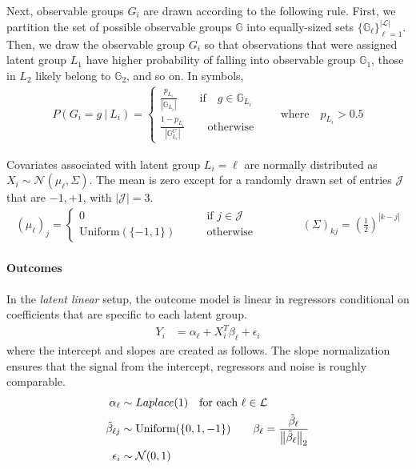 \documentclass{article}
\theoremstyle{plain}
\theoremstyle{definition}
\theoremstyle{remark}
\begin{document}
\noindent Next, observable groups $G_{i}$ are drawn according to the following rule. First, we partition the set of possible observable groups $\mathbb{G}$ into equally-sized sets $\{\mathbb{G}_{\ell}\}_{\ell=1}^{|\mathcal{L}|}$. Then, we draw the observable group $G_{i}$ so that observations that were assigned latent group $L_{1}$ have higher probability of falling into observable group $\mathbb{G}_{1}$, those in $L_{2}$ likely belong to $\mathbb{G}_{2}$, and so on. In symbols,
\begin{align}
    P(G_{i} = g \ | \ L_{i}) =
        \begin{cases}
            \frac{p_{L_{i}}}{|\mathbb{G}_{L_{i}}|}
            \qquad \text{if}\quad g \in \mathbb{G}_{L_{i}}\\
            \frac{1-p_{L_{i}}}{|\mathbb{G}_{L_{i}}^{C}|} \qquad \text{otherwise}
        \end{cases}
    \qquad
    \text{where} \quad p_{L_{i}} > 0.5
\end{align}

Covariates associated with latent group $L_{i} = \ell$ are normally distributed as $X_{i} \sim \mathcal{N}(\mu_{\ell}, \Sigma)$. The mean is zero except for a randomly drawn set of entries $\mathcal{J}$ that are ${-1, +1}$, with $|\mathcal{J}| = 3$.
\begin{align}
  (\mu_{\ell})_{j} =
  \begin{cases}
    0 \qquad &\text{if } j \in \mathcal{J}\\
    \text{Uniform}(\{-1, 1\}) \qquad &\text{otherwise}
  \end{cases}
  \qquad \qquad
  (\Sigma)_{kj} = \left(\frac{1}{2}\right)^{|k - j|}
\end{align}

\paragraph{Outcomes} In the \emph{latent linear} setup, the outcome model is linear in regressors conditional on coefficients that are specific to each latent group.
\begin{align}
  Y_{i} &= \alpha_{\ell} + X_{i}^{T}\beta_{\ell} + \epsilon_{i} \label{eq:linear_outcome}
\end{align}
where the intercept and slopes are created as follows. The slope normalization ensures that the signal from the intercept, regressors and noise is roughly comparable.
\begin{align}
\alpha_{\ell} &\sim Laplace(1) \quad \text{for each }\ell \in \mathcal{L} \label{eq:intercept} \\
\tilde{\beta}_{\ell j} &\sim \text{Uniform}(\{0, 1, -1\}) \qquad \beta_{\ell} = \frac{\tilde{\beta}_{\ell}}{\left\lVert\tilde{\beta}_{\ell}\right\rVert_{2}} \label{eq:slopes} \\
\epsilon_{i} &\sim \mathcal{N}(0, 1)
\end{align}
\end{document}
